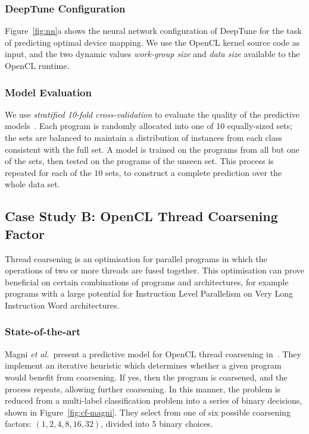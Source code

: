 \subsubsection{DeepTune Configuration} Figure~\ref{fig:nn}a shows the neural network configuration of DeepTune for the task of predicting optimal device mapping. We use the OpenCL kernel source code as input, and the two dynamic values \emph{work-group size} and \emph{data size} available to the OpenCL runtime.

\subsubsection{Model Evaluation} We use \emph{stratified 10-fold cross-validation} to evaluate the quality of the predictive models~\cite{Han2011}. Each program is randomly allocated into one of 10 equally-sized sets; the sets are balanced to maintain a distribution of instances from each class consistent with the full set. A model is trained on the programs from all but one of the sets, then tested on the programs of the unseen set. This process is repeated for each of the 10 sets, to construct a complete prediction over the whole data set.






\subsection{Case Study B: OpenCL Thread Coarsening Factor} \label{subsec:case-study-b}



Thread coarsening is an optimisation for parallel programs in which the operations of two or more threads are fused together. This optimisation can prove beneficial on certain combinations of programs and architectures, for example programs with a large potential for Instruction Level Parallelism on Very Long Instruction Word architectures.

\subsubsection{State-of-the-art} Magni \emph{et al.\ }present a predictive model for OpenCL thread coarsening in~\cite{Magni2014}. They implement an iterative heuristic which determines whether a given program would benefit from coarsening. If yes, then the program is coarsened, and the process repeats, allowing further coarsening. In this manner, the problem is reduced from a multi-label classification problem into a series of binary decisions, shown in Figure~\ref{fig:cf-magni}. They select from one of six possible coarsening factors: $(1, 2, 4, 8, 16, 32)$, divided into 5 binary choices.


